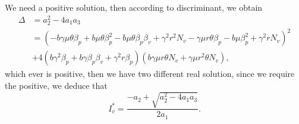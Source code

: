 We need a positive solution, then according to discriminant, we obtain
\begin{equation*}
	\begin{aligned}
		\Delta &= 
		a_2  ^ 2 -  4a_1 a_3
		\\
		&=
			(
				- b \gamma \mu \theta \beta_p +
				b \mu \theta \beta_p^2 -
				b \mu \theta \beta_p \beta_v + 
				\gamma ^ 2 r ^ 2 N_v - 
				\gamma \mu r \theta \beta_p - 
				b \mu \beta_p ^ 2 + 
				\gamma ^ 2 r N_v 
			) ^ 2
		\\
		& +  
		4( 
			b \gamma ^ 2 \beta_p + 
			b \gamma \beta_p
			\beta_v + 
			\gamma^2 r \beta_p
		)
		(
			b \gamma \mu r 
			\theta N_v + 
			\gamma \mu r ^ 2 \theta N_v
		),			
	\end{aligned}	
\end{equation*}
which ever is positive, then we have two different real solution, 
since we require the positive, we deduce that
\begin{equation*}
	I^{*}_{v} = 
		\frac{
			-a_2 + 
			\sqrt{a_2^2 - 4a_1 a_3}}%
		{2a_1}.
\end{equation*}
